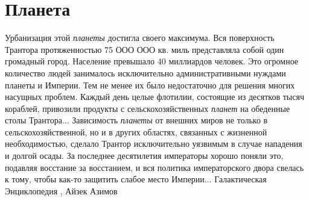  
 
 
 
 
\chapter{Планета}

Урбанизация этой \emph{планеты} достигла своего максимума. Вся поверхность Трантора
протяженностью 75 ООО ООО кв. миль представляла собой один громадный город.
Население превышало 40 миллиардов человек. Это огромное количество людей
занималось исключительно административными нуждами планеты и Империи. Тем не
менее их было недостаточно для решения многих насущных проблем. Каждый день
целые флотилии, состоящие из десятков тысяч кораблей, привозили продукты с
сельскохозяйственных \emph{планет} на обеденные столы Трантора...
Зависимость \emph{планеты} от внешних миров не только в сельскохозяйственной,
но и в других областях, связанных с жизненной необходимостью, сделало Трантор
исключительно уязвимым в случае нападения и долгой осады. За последнее
десятилетия императоры хорошо поняли это, подавляя восстание за восстанием, и
вся политика императорского двора свелась к тому, чтобы как-то защитить слабое
место Империи... Галактическая Энциклопедия
, Айзек Азимов
